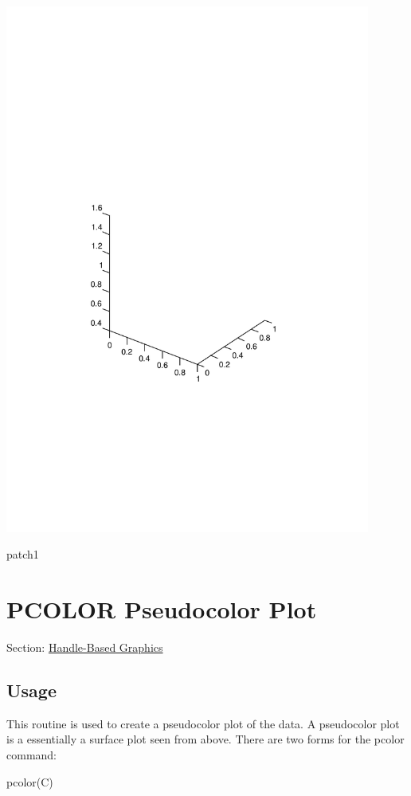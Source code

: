  
\begin{DoxyImage}
\includegraphics[width=12cm]{patch1}
\caption{patch1}
\end{DoxyImage}
 \hypertarget{handle_pcolor}{}\section{P\-C\-O\-L\-O\-R Pseudocolor Plot}\label{handle_pcolor}
Section\-: \hyperlink{sec_handle}{Handle-\/\-Based Graphics} \hypertarget{vtkwidgets_vtkxyplotwidget_Usage}{}\subsection{Usage}\label{vtkwidgets_vtkxyplotwidget_Usage}
This routine is used to create a pseudocolor plot of the data. A pseudocolor plot is a essentially a surface plot seen from above. There are two forms for the {\ttfamily pcolor} command\-: \begin{DoxyVerb}   pcolor(C)
\end{DoxyVerb}
